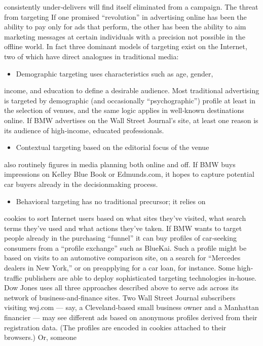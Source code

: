 consistently under‐delivers will find itself eliminated from a campaign.
The threat from targeting
If one promised ``revolution'' in advertising online has been the ability to
pay only for ads that perform, the other has been the ability to aim
marketing messages at certain individuals with a precision not possible in
the offline world. In fact three dominant models of targeting exist on the
Internet, two of which have direct analogues in traditional media:
\begin{itemize}
\item Demographic targeting uses characteristics such as age, gender,
\end{itemize}
income, and education to define a desirable audience. Most
traditional advertising is targeted by demographic (and
occasionally ``psychographic'') profile at least in the selection of
venues, and the same logic applies in well‐known destinations
online. If BMW advertises on the Wall Street Journal’s site, at
least one reason is its audience of high‐income, educated
professionals.
\begin{itemize}
\item Contextual targeting based on the editorial focus of the venue
\end{itemize}
also routinely figures in media planning both online and off. If
BMW buys impressions on Kelley Blue Book or Edmunds.com,
it hopes to capture potential car buyers already in the decisionmaking
process.
\begin{itemize}
\item Behavioral targeting has no traditional precursor; it relies on
\end{itemize}
cookies to sort Internet users based on what sites they’ve
visited, what search terms they’ve used and what actions
they’ve taken. If BMW wants to target people already in the
purchasing ``funnel'' it can buy profiles of car‐seeking
consumers from a ``profile exchange'' such as BlueKai. Such a
profile might be based on visits to an automotive comparison
site, on a search for ``Mercedes dealers in New York,'' or on preapplying
for a car loan, for instance.
Some high‐traffic publishers are able to deploy sophisticated targeting
technologies in‐house. Dow Jones uses all three approaches described
above to serve ads across its network of business‐and‐finance sites. Two
Wall Street Journal subscribers visiting wsj.com — say, a Cleveland‐based
small business owner and a Manhattan financier — may see different ads
based on anonymous profiles derived from their registration data. (The
profiles are encoded in cookies attached to their browsers.) Or, someone
